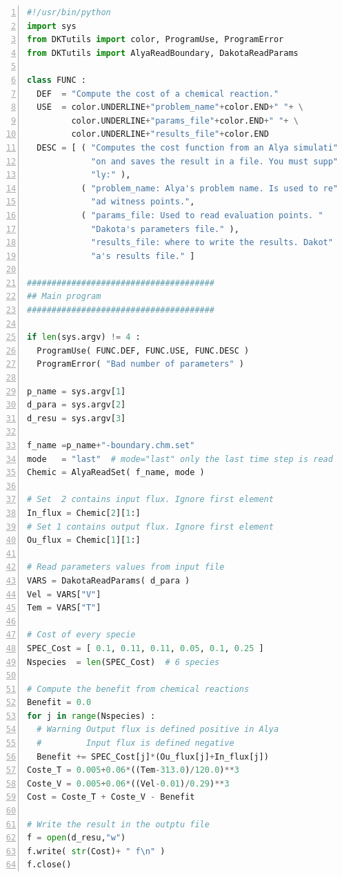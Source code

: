 \documentclass[12pt,a4paper,article]{memoir}
\begin{document}
\begin{lstlisting}[style=MyCodeStyle,language=Python,numbers=left]
#!/usr/bin/python
import sys
from DKTutils import color, ProgramUse, ProgramError
from DKTutils import AlyaReadBoundary, DakotaReadParams

class FUNC :
  DEF  = "Compute the cost of a chemical reaction."
  USE  = color.UNDERLINE+"problem_name"+color.END+" "+ \
         color.UNDERLINE+"params_file"+color.END+" "+ \
         color.UNDERLINE+"results_file"+color.END
  DESC = [ ( "Computes the cost function from an Alya simulati"
             "on and saves the result in a file. You must supp"
             "ly:" ),
           ( "problem_name: Alya's problem name. Is used to re"
             "ad witness points.",
           ( "params_file: Used to read evaluation points. "
             "Dakota's parameters file." ),
             "results_file: where to write the results. Dakot"
             "a's results file." ]

######################################
## Main program
######################################

if len(sys.argv) != 4 :
  ProgramUse( FUNC.DEF, FUNC.USE, FUNC.DESC )
  ProgramError( "Bad number of parameters" )

p_name = sys.argv[1]
d_para = sys.argv[2]
d_resu = sys.argv[3]

f_name =p_name+"-boundary.chm.set"
mode   = "last"  # mode="last" only the last time step is read
Chemic = AlyaReadSet( f_name, mode )

# Set  2 contains input flux. Ignore first element
In_flux = Chemic[2][1:]
# Set 1 contains output flux. Ignore first element
Ou_flux = Chemic[1][1:]

# Read parameters values from input file
VARS = DakotaReadParams( d_para )
Vel = VARS["V"]
Tem = VARS["T"]

# Cost of every specie
SPEC_Cost = [ 0.1, 0.11, 0.11, 0.05, 0.1, 0.25 ]
Nspecies  = len(SPEC_Cost)  # 6 species

# Compute the benefit from chemical reactions
Benefit = 0.0
for j in range(Nspecies) :
  # Warning Output flux is defined positive in Alya
  #         Input flux is defined negative
  Benefit += SPEC_Cost[j]*(Ou_flux[j]+In_flux[j])
Coste_T = 0.005+0.06*((Tem-313.0)/120.0)**3
Coste_V = 0.005+0.06*((Vel-0.01)/0.29)**3
Cost = Coste_T + Coste_V - Benefit

# Write the result in the outptu file
f = open(d_resu,"w")
f.write( str(Cost)+ " f\n" )
f.close()
\end{lstlisting}
\end{document}
